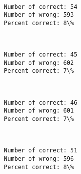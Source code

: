 \documentclass[11pt]{article}
\begin{document}
    \begin{center}
    \end{center}
    { \hspace*{\fill} \\}
    
    \begin{Verbatim}[commandchars=\\\{\}]
Number of correct: 54
Number of wrong: 593
Percent correct: 8\%

    \end{Verbatim}

    \begin{center}
    \end{center}
    { \hspace*{\fill} \\}
    
    \begin{Verbatim}[commandchars=\\\{\}]
Number of correct: 45
Number of wrong: 602
Percent correct: 7\%

    \end{Verbatim}

    \begin{center}
    \end{center}
    { \hspace*{\fill} \\}
    
    \begin{Verbatim}[commandchars=\\\{\}]
Number of correct: 46
Number of wrong: 601
Percent correct: 7\%

    \end{Verbatim}

    \begin{center}
    \end{center}
    { \hspace*{\fill} \\}
    
    \begin{Verbatim}[commandchars=\\\{\}]
Number of correct: 51
Number of wrong: 596
Percent correct: 8\%

    \end{Verbatim}
\end{document}
